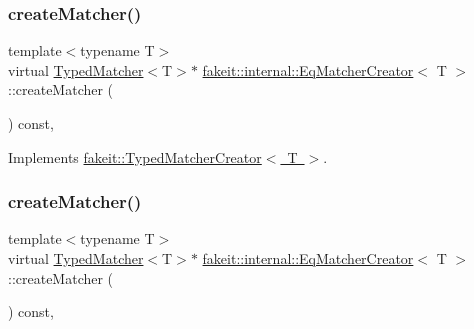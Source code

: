 \mbox{\label{structfakeit_1_1internal_1_1EqMatcherCreator_a0ab880ca3aa803487b6cbb418bc2ccfc}} 
\subsubsection{\texorpdfstring{createMatcher()}{createMatcher()}\hspace{0.1cm}{\footnotesize\ttfamily [2/9]}}
{\footnotesize\ttfamily template$<$typename T$>$ \\
virtual \mbox{\hyperlink{structfakeit_1_1TypedMatcher}{Typed\+Matcher}}$<$T$>$$\ast$ \mbox{\hyperlink{structfakeit_1_1internal_1_1EqMatcherCreator}{fakeit\+::internal\+::\+Eq\+Matcher\+Creator}}$<$ T $>$\+::create\+Matcher (\begin{DoxyParamCaption}{ }\end{DoxyParamCaption}) const\hspace{0.3cm}{\ttfamily [inline]}, {\ttfamily [virtual]}}



Implements \mbox{\hyperlink{structfakeit_1_1TypedMatcherCreator_a40646cd11f8acf5c34b971f396891d5c}{fakeit\+::\+Typed\+Matcher\+Creator$<$ T $>$}}.

\mbox{\label{structfakeit_1_1internal_1_1EqMatcherCreator_a0ab880ca3aa803487b6cbb418bc2ccfc}} 
\subsubsection{\texorpdfstring{createMatcher()}{createMatcher()}\hspace{0.1cm}{\footnotesize\ttfamily [3/9]}}
{\footnotesize\ttfamily template$<$typename T$>$ \\
virtual \mbox{\hyperlink{structfakeit_1_1TypedMatcher}{Typed\+Matcher}}$<$T$>$$\ast$ \mbox{\hyperlink{structfakeit_1_1internal_1_1EqMatcherCreator}{fakeit\+::internal\+::\+Eq\+Matcher\+Creator}}$<$ T $>$\+::create\+Matcher (\begin{DoxyParamCaption}{ }\end{DoxyParamCaption}) const\hspace{0.3cm}{\ttfamily [inline]}, {\ttfamily [virtual]}}




